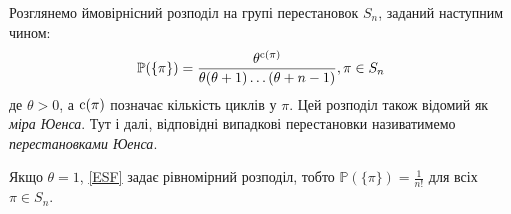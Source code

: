 Розглянемо ймовірнісний розподіл на групі перестановок $S_n$, 
заданий наступним чином:
\begin{equation}\label{ESF}
    \mathbb{P}(\{\pi\}) = \frac{
        \theta^{\operatorname{c}(\pi)}
    }{
        \theta (\theta + 1) \dots (\theta + n - 1)
    }, \pi \in S_n
\end{equation}
де $\theta > 0$, а $\operatorname{c}(\pi)$ позначає кількість циклів у $\pi$.
Цей розподіл також відомий як
\emph{міра Юенса}. Тут і далі,
відповідні випадкові перестановки називатимемо
\emph{перестановками Юенса}.

\begin{remark}
    Якщо $\theta = 1$, \eqref{ESF} задає рівномірний розподіл,
    тобто $\mathbb{P}(\{\pi\}) = \frac{1}{n!}$ для всіх $\pi \in S_n$.
\end{remark}

